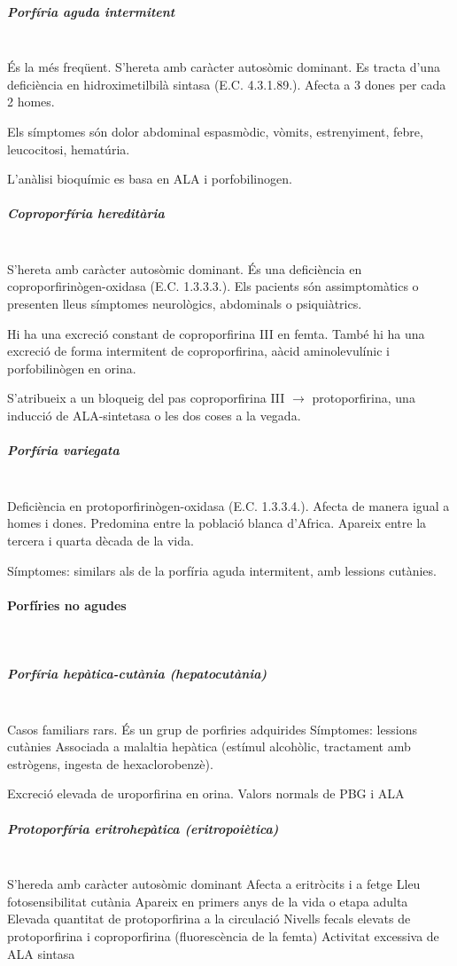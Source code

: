 \begin{itemize}
\subparagraph{Porfíria aguda intermitent}  \hfill \\
És la més freqüent. S'hereta amb caràcter autosòmic dominant.
Es tracta d'una deficiència en hidroximetilbilà sintasa (E.C. 4.3.1.89.). Afecta a 3 dones per cada 2 homes.

Els símptomes són dolor abdominal espasmòdic, vòmits, estrenyiment, febre, leucocitosi, hematúria.

L'anàlisi bioquímic es basa en ALA i porfobilinogen.

\subparagraph{Coproporfíria hereditària} \hfill \\
S'hereta amb caràcter autosòmic dominant.
És una deficiència en coproporfirinògen-oxidasa (E.C. 1.3.3.3.). Els pacients són assimptomàtics o presenten lleus símptomes neurològics, abdominals o psiquiàtrics.

Hi ha una excreció constant de coproporfirina III en femta. També hi ha una excreció de forma intermitent de coproporfirina, aàcid aminolevulínic i porfobilinògen en orina.

S’atribueix a un bloqueig del pas coproporfirina III $\rightarrow$ protoporfirina, una inducció de ALA-sintetasa o les dos coses a la vegada.

\subparagraph{Porfíria variegata} \hfill \\
Deficiència en protoporfirinògen-oxidasa (E.C. 1.3.3.4.). Afecta de manera igual a homes i dones. Predomina entre la població blanca d’Africa. Apareix entre la tercera i quarta dècada de la vida.

Símptomes: similars als de la porfíria aguda intermitent, amb lessions cutànies. 

\paragraph{Porfíries no agudes} \hfill \\

\subparagraph{Porfíria hepàtica-cutània (hepatocutània)}  \hfill \\
Casos familiars rars. És un grup de porfiries adquirides Símptomes: lessions cutànies
Associada a malaltia hepàtica (estímul alcohòlic, tractament amb estrògens, ingesta de hexaclorobenzè).

Excreció elevada de uroporfirina en orina. Valors normals de PBG i ALA

\subparagraph{Protoporfíria eritrohepàtica (eritropoiètica)} \hfill \\
S’hereda amb caràcter autosòmic dominant
Afecta a eritròcits i a fetge
Lleu fotosensibilitat cutània
Apareix en primers anys de la vida o etapa adulta
Elevada quantitat de protoporfirina a la circulació
Nivells fecals elevats de protoporfirina i coproporfirina (fluorescència de la femta)
Activitat excessiva de ALA sintasa


\end{itemize}
